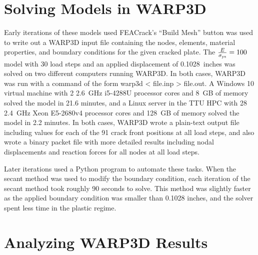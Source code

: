 \section{Solving Models in WARP3D}

Early iterations of these models used FEACrack's ``Build Mesh'' button was used to write out a WARP3D input file containing the nodes, elements, material properties, and boundary conditions for the given cracked plate.
The \(\frac{E}{\sigma_{\textnormal{ys}}}=100\) model with 30 load steps and an applied displacement of 0.1028~inches was solved on two different computers running WARP3D.
In both cases, WARP3D was run with a command of the form {\ttfamily warp3d < file.inp > file.out}.
A Windows 10 virtual machine with 2 2.6~GHz i5-4288U processor cores and 8~GB of memory solved the model in 21.6 minutes, and
a Linux server in the TTU HPC with 28 2.4~GHz Xeon E5-2680v4 processor cores and 128~GB of memory solved the model in 2.2 minutes.
In both cases, WARP3D wrote a plain-text output file including \J values for each of the 91 crack front positions at all load steps, and also wrote a binary packet file with more detailed results including nodal displacements and reaction forces for all nodes at all load steps.

Later iterations used a Python program to automate these tasks.
When the secant method was used to modify the boundary condition, each iteration of the secant method took roughly 90 seconds to solve.
This method was slightly faster as the applied boundary condition was smaller than 0.1028 inches, and the solver spent less time in the plastic regime.

\section{Analyzing WARP3D Results}

